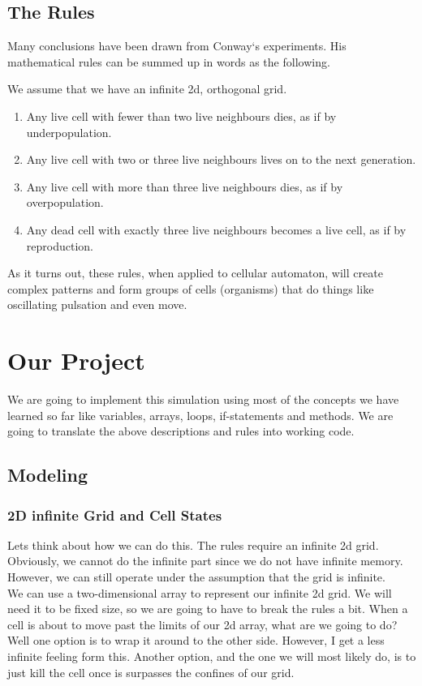 \documentclass[11]{article}
\begin{document}
\subsection{The Rules}
Many conclusions have been drawn from Conway`s experiments. His mathematical rules can be summed up in words as the following.

We assume that we have an infinite 2d, orthogonal grid.

\begin{enumerate}
  \item Any live cell with fewer than two live neighbours dies, as if by underpopulation.
  \item Any live cell with two or three live neighbours lives on to the next generation.
  \item Any live cell with more than three live neighbours dies, as if by overpopulation.
  \item Any dead cell with exactly three live neighbours becomes a live cell, as if by reproduction.
\end{enumerate}

As it turns out, these rules, when applied to cellular automaton, will create complex patterns and form groups of cells (organisms) that do things like oscillating pulsation and even move.

\section{Our Project} 
We are going to implement this simulation using most of the concepts we have learned so far like variables, arrays, loops, if-statements and methods. We are going to translate the above descriptions and rules into working code.

\subsection{Modeling}
\subsubsection{2D infinite Grid and Cell States}
Lets think about how we can do this. The rules require an infinite 2d grid. Obviously, we cannot do the infinite part since we do not have infinite memory. However, we can still operate under the assumption that the grid is infinite.\\

We can use a two-dimensional array to represent our infinite 2d grid. We will need it to be fixed size, so we are going to have to break the rules a bit. When a cell is about to move past the limits of our 2d array, what are we going to do? Well one option is to wrap it around to the other side. However, I get a less infinite feeling form this. Another option, and the one we will most likely do, is to just kill the cell once is surpasses the confines of our grid.\\
\end{document}
